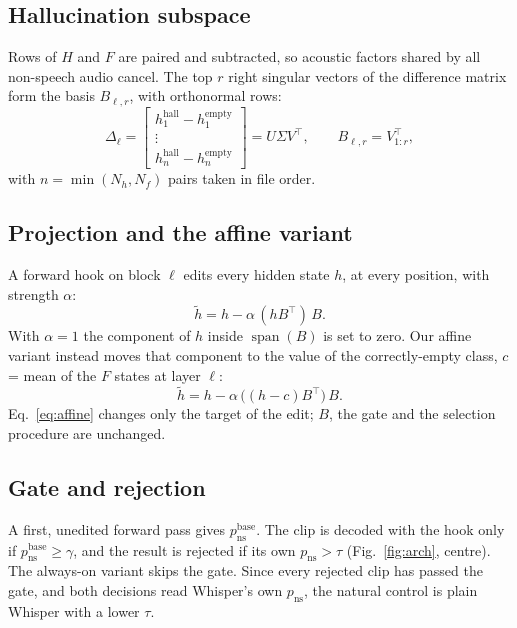 \documentclass[conference,a4paper]{IEEEtran}
\newcommand{\pns}{p_{\mathrm{ns}}}
\newcommand{\pnsbase}{p_{\mathrm{ns}}^{\mathrm{base}}}
\newcommand{\hall}{\mathrm{hall}}
\newcommand{\empt}{\mathrm{empty}}
\begin{document}
\subsection{Hallucination subspace}
\label{sec:subspace}
Rows of $H$ and $F$ are paired and subtracted, so acoustic factors shared by all non-speech audio cancel. The top $r$ right singular vectors of the difference matrix form the basis $B_{\ell,r}$, with orthonormal rows:
\begin{equation*}
\Delta_\ell =
\begin{bmatrix}
h^{\hall}_1 - h^{\empt}_1\\ \vdots \\ h^{\hall}_n - h^{\empt}_n
\end{bmatrix}
= U\Sigma V^{\top}, \qquad B_{\ell,r} = V^{\top}_{1:r},
\end{equation*}
with $n = \min(N_h, N_f)$ pairs taken in file order.

\subsection{Projection and the affine variant}
A forward hook on block $\ell$ edits every hidden state $h$, at every position, with strength $\alpha$:
\begin{equation}
\tilde{h} = h - \alpha\,(hB^{\top})\,B .
\label{eq:proj}
\end{equation}
With $\alpha = 1$ the component of $h$ inside $\operatorname{span}(B)$ is set to zero. Our affine variant instead moves that component to the value of the correctly-empty class, $c$ = mean of the $F$ states at layer $\ell$:
\begin{equation}
\tilde{h} = h - \alpha\,\big((h - c)B^{\top}\big)\,B .
\label{eq:affine}
\end{equation}
Eq.~\eqref{eq:affine} changes only the target of the edit; $B$, the gate and the selection procedure are unchanged.

\subsection{Gate and rejection}
A first, unedited forward pass gives $\pnsbase$. The clip is decoded with the hook only if $\pnsbase \ge \gamma$, and the result is rejected if its own $\pns > \tau$ (Fig.~\ref{fig:arch}, centre). The always-on variant skips the gate. Since every rejected clip has passed the gate, and both decisions read Whisper's own $\pns$, the natural control is plain Whisper with a lower $\tau$.
\end{document}
